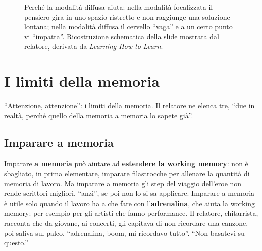 \begin{figure}[htbp]
\centering
{}
\caption{Perché la modalità diffusa aiuta: nella modalità focalizzata il
pensiero gira in uno spazio ristretto e non raggiunge una soluzione
lontana; nella modalità diffusa il cervello ``vaga'' e a un certo punto vi
``impatta''. Ricostruzione schematica della slide mostrata dal relatore,
derivata da \emph{Learning How to Learn}.}
\label{p0:fig:modi}
\end{figure}

\section{I limiti della memoria}
\label{p0:sec:limiti}

``Attenzione, attenzione'': i limiti della memoria. Il relatore ne elenca
tre, ``due in realtà, perché quello della memoria a memoria lo sapete
già''.

\subsection{Imparare a memoria}

Imparare \textbf{a memoria} può aiutare ad \textbf{estendere la working
memory}: non è sbagliato, in prima elementare, imparare filastrocche per
allenare la quantità di memoria di lavoro. Ma imparare a memoria gli step
del viaggio dell'eroe non rende scrittori migliori, ``anzi'', se poi non lo
si sa applicare. Imparare a memoria è utile solo quando il lavoro ha a che
fare con l'\textbf{adrenalina}, che aiuta la working memory: per esempio per
gli artisti che fanno performance. Il relatore, chitarrista, racconta che da
giovane, ai concerti, gli capitava di non ricordare una canzone, poi saliva
sul palco, ``adrenalina, boom, mi ricordavo tutto''. ``Non basatevi su
questo.''

